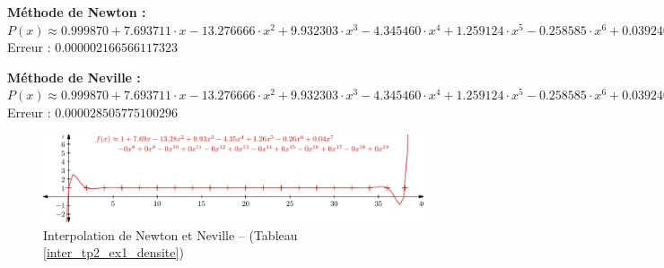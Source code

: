 \documentclass{report}
\begin{document}
	\noindent\textbf{Méthode de Newton :}\\
	$P(x) \approx 0.999870 + 7.693711 \cdot x - 13.276666 \cdot x^{2}  + 9.932303 \cdot x^{3} - 4.345460 \cdot x^{4}  + 1.259124 \cdot x^{5} - 0.258585 \cdot x^{6}  + 0.039240 \cdot x^{7} - 0.004520 \cdot x^{8}  + 0.000402 \cdot x^{9} - 0.000028 \cdot x^{10}  + 0.000002 \cdot x^{11} - 0.000000 \cdot x^{12}  + 0.000000 \cdot x^{13} - 0.000000 \cdot x^{14}  + 0.000000 \cdot x^{15} - 0.000000 \cdot x^{16}  + 0.000000 \cdot x^{17} - 0.000000 \cdot x^{18}  + 0.000000 \cdot x^{19} $\\
	Erreur : $0.000002166566117323$
	\newline
	
	\noindent\textbf{Méthode de Neville :}\\
	$P(x) \approx 0.999870 + 7.693711 \cdot x- 13.276666 \cdot x^{2}  + 9.932303 \cdot x^{3} - 4.345460 \cdot x^{4}  + 1.259124 \cdot x^{5} - 0.258585 \cdot x^{6}  + 0.039240 \cdot x^{7} - 0.004520 \cdot x^{8}  + 0.000402 \cdot x^{9} - 0.000028 \cdot x^{10}  + 0.000002 \cdot x^{11} - 0.000000 \cdot x^{12}  + 0.000000 \cdot x^{13} - 0.000000 \cdot x^{14}  + 0.000000 \cdot x^{15} - 0.000000 \cdot x^{16}  + 0.000000 \cdot x^{17} - 0.000000 \cdot x^{18}  + 0.000000 \cdot x^{19} $\\
	Erreur : $0.000028505775100296$
	\newline
	\newline
		  
	\begin{figure}[h]
	  \centering
	  \includegraphics{graphiques/pdf_output/inter_tp2_ex1.pdf}
	  \caption{Interpolation de Newton et Neville -- (Tableau \ref{inter_tp2_ex1_densite})}
	\end{figure}
      \newpage
    
\end{document}
